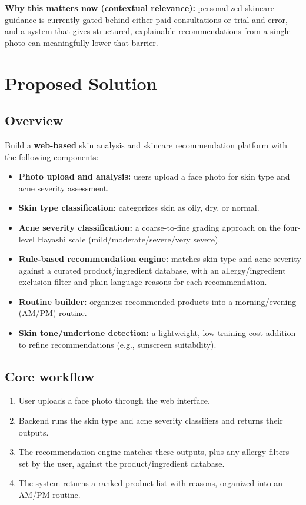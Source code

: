 \documentclass[11pt,a4paper]{article}
\begin{document}
\textbf{Why this matters now (contextual relevance):} personalized skincare guidance is currently gated behind either paid consultations or trial-and-error, and a system that gives structured, explainable recommendations from a single photo can meaningfully lower that barrier.

\section{Proposed Solution}
\subsection{Overview}
Build a \textbf{web-based} skin analysis and skincare
recommendation platform with the following components:
\begin{itemize}[leftmargin=0.7cm]
    \item \textbf{Photo upload and analysis:} users upload a face photo for skin type and acne severity assessment.
    \item \textbf{Skin type classification:} categorizes skin as oily, dry, or normal.
    \item \textbf{Acne severity classification:} a coarse-to-fine grading approach on the four-level Hayashi scale (mild/moderate/severe/very severe).
    \item \textbf{Rule-based recommendation engine:} matches skin type and acne severity against a curated product/ingredient database, with an allergy/ingredient exclusion filter and plain-language reasons for each recommendation.
    \item \textbf{Routine builder:} organizes recommended products into a morning/evening (AM/PM) routine.
    \item \textbf{Skin tone/undertone detection:} a lightweight, low-training-cost addition to refine recommendations (e.g., sunscreen suitability).
\end{itemize}

\subsection{Core workflow}
\begin{enumerate}[leftmargin=0.7cm]
    \item User uploads a face photo through the web interface.
    \item Backend runs the skin type and acne severity classifiers and returns their outputs.
    \item The recommendation engine matches these outputs, plus any allergy filters set by the user, against the product/ingredient database.
    \item The system returns a ranked product list with reasons, organized into an AM/PM routine.
\end{enumerate}
\end{document}
